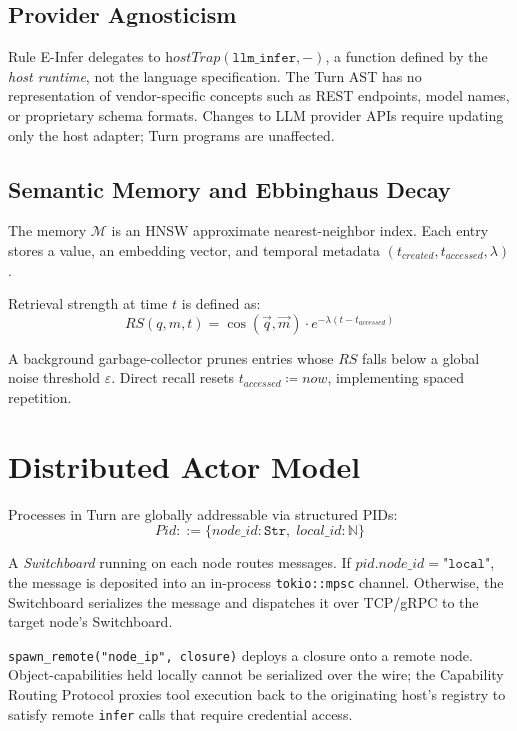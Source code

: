\documentclass[sigplan,10pt,review,anonymous]{acmart}
\begin{document}
\subsection{Provider Agnosticism}

Rule E-Infer delegates to $\textit{hostTrap}(\texttt{llm\_infer}, -)$, a
function defined by the \emph{host runtime}, not the language specification.
The Turn AST has no representation of vendor-specific concepts such as REST
endpoints, model names, or proprietary schema formats. Changes to LLM provider
APIs require updating only the host adapter; Turn programs are unaffected.

\subsection{Semantic Memory and Ebbinghaus Decay}

The memory $\mathcal{M}$ is an HNSW approximate nearest-neighbor index. Each
entry stores a value, an embedding vector, and temporal metadata
$(t_{\textit{created}}, t_{\textit{accessed}}, \lambda)$.

Retrieval strength at time $t$ is defined as:
$$\mathit{RS}(q, m, t) = \cos(\vec{q}, \vec{m}) \cdot e^{-\lambda (t - t_{\textit{accessed}})}$$

A background garbage-collector prunes entries whose $\mathit{RS}$ falls below
a global noise threshold $\varepsilon$. Direct recall resets
$t_{\textit{accessed}} \coloneq \textit{now}$, implementing spaced repetition.

\section{Distributed Actor Model}

Processes in Turn are globally addressable via structured PIDs:
$$\textit{Pid} ::= \{ \textit{node\_id} : \mathtt{Str},\; \textit{local\_id} : \mathbb{N} \}$$

A \emph{Switchboard} running on each node routes messages. If
$\textit{pid}.\textit{node\_id} = \texttt{"local"}$, the message is deposited
into an in-process \texttt{tokio::mpsc} channel. Otherwise, the Switchboard
serializes the message and dispatches it over TCP/gRPC to the target node's
Switchboard.

\texttt{spawn\_remote("node\_ip", closure)} deploys a closure onto a remote
node. Object-capabilities held locally cannot be serialized over the wire; the
Capability Routing Protocol proxies tool execution back to the originating
host's registry to satisfy remote \texttt{infer} calls that require credential
access.
\end{document}

